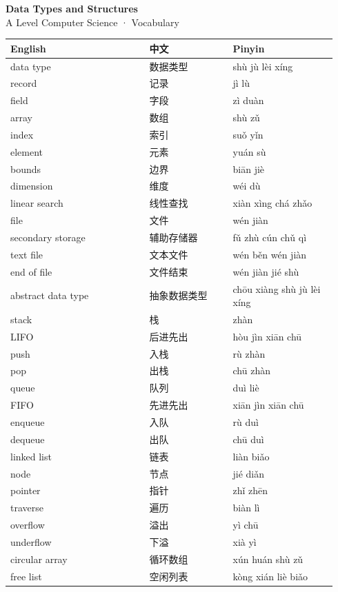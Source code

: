 \documentclass[11pt]{article}
\begin{document}
\begin{center}
  {\LARGE\bfseries Data Types and Structures}\\[0.35em]
  {\large A Level Computer Science · Vocabulary}
\end{center}
\vspace{0.6em}

\begin{longtable}{@{}p{0.40\linewidth}p{0.24\linewidth}p{0.30\linewidth}@{}}
\toprule
\textbf{English} & \textbf{中文} & \textbf{Pinyin} \\
\midrule
\endhead
\bottomrule
\endlastfoot
data type & 数据类型 & shù jù lèi xíng \\
record & 记录 & jì lù \\
field & 字段 & zì duàn \\
array & 数组 & shù zǔ \\
index & 索引 & suǒ yǐn \\
element & 元素 & yuán sù \\
bounds & 边界 & biān jiè \\
dimension & 维度 & wéi dù \\
linear search & 线性查找 & xiàn xìng chá zhǎo \\
file & 文件 & wén jiàn \\
secondary storage & 辅助存储器 & fǔ zhù cún chǔ qì \\
text file & 文本文件 & wén běn wén jiàn \\
end of file & 文件结束 & wén jiàn jié shù \\
abstract data type & 抽象数据类型 & chōu xiàng shù jù lèi xíng \\
stack & 栈 & zhàn \\
LIFO & 后进先出 & hòu jìn xiān chū \\
push & 入栈 & rù zhàn \\
pop & 出栈 & chū zhàn \\
queue & 队列 & duì liè \\
FIFO & 先进先出 & xiān jìn xiān chū \\
enqueue & 入队 & rù duì \\
dequeue & 出队 & chū duì \\
linked list & 链表 & liàn biǎo \\
node & 节点 & jié diǎn \\
pointer & 指针 & zhǐ zhēn \\
traverse & 遍历 & biàn lì \\
overflow & 溢出 & yì chū \\
underflow & 下溢 & xià yì \\
circular array & 循环数组 & xún huán shù zǔ \\
free list & 空闲列表 & kòng xián liè biǎo \\
\end{longtable}
\end{document}
